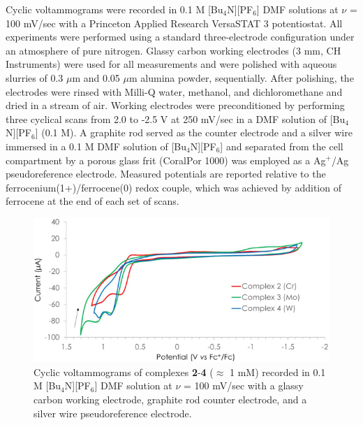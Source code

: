 Cyclic voltammograms were recorded in 0.1 M [Bu$_{4}$N][PF$_{6}$] DMF solutions at $\nu$ = 100 mV/sec with a Princeton Applied Research VersaSTAT 3 potentiostat. All experiments were performed using a standard three-electrode configuration under an atmosphere of pure nitrogen. Glassy carbon working electrodes (3 mm, CH Instruments) were used for all measurements and were polished with aqueous slurries of 0.3 $\mu$m and 0.05 $\mu$m alumina powder, sequentially. After polishing, the electrodes were rinsed with Milli-Q water, methanol, and dichloromethane and dried in a stream of air. Working electrodes were preconditioned by performing three cyclical scans from 2.0 to -2.5 V at 250 mV/sec in a DMF solution of [Bu$_{4}$N][PF$_{6}$] (0.1 M). A graphite rod served as the counter electrode and a silver wire immersed in a 0.1 M DMF solution of [Bu$_{4}$N][PF$_{6}$] and separated from the cell compartment by a porous glass frit (CoralPor 1000) was employed as a Ag$^{+}$/Ag pseudoreference electrode. Measured potentials are reported relative to the ferrocenium(1+)/ferrocene(0) redox couple, which was achieved by addition of ferrocene at the end of each set of scans.

\begin{figure}
    \centering
    \includegraphics[width=0.8\linewidth]{figures/pub2/si_fig3.png}
    \caption{Cyclic voltammograms of complexes \textbf{2}-\textbf{4} ($\approx$ 1 mM) recorded in 0.1 M [Bu$_{4}$N][PF$_{6}$] DMF solution at $\nu$ = 100 mV/sec with a glassy carbon working electrode, graphite rod counter electrode, and a silver wire pseudoreference electrode.}\label{fig:cv}
\end{figure}


